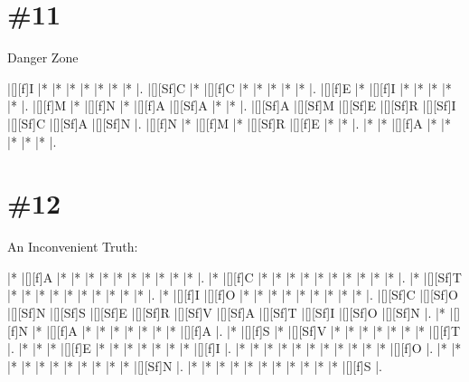 \documentclass[letterpaper]{article}
\begin{document}
\section*{\#11}
Danger Zone

\vspace*{1em}
\begin{Puzzle}{8}{7}
|[][f]I   |*        |*        |*        |*        |*        |*        |*        |. 
|[][Sf]C  |*        |[][f]C   |*        |*        |*        |*        |*        |.  
|[][f]E   |*        |[][f]I   |*        |*        |*        |*        |*        |.
|[][f]M   |*        |[][f]N   |*        |[][f]A   |[][Sf]A  |*        |*        |.  
|[][Sf]A  |[][Sf]M  |[][Sf]E  |[][Sf]R  |[][Sf]I  |[][Sf]C  |[][Sf]A  |[][Sf]N  |.
|[][f]N   |*        |[][f]M   |*        |[][Sf]R  |[][f]E   |*        |*        |. 
|*        |*        |[][f]A   |*        |*        |*        |*        |*        |.
\end{Puzzle}

\section*{\#12}

An Inconvenient Truth:
\vspace*{1em}
\begin{Puzzle}{12}{11}
|*        |[][f]A   |*        |*        |*        |*        |*        |*        |*        |*        |*        |*        |. 
|*        |[][f]C   |*        |*        |*        |*        |*        |*        |*        |*        |*        |*        |.  
|*        |[][Sf]T  |*        |*        |*        |*        |*        |*        |*        |*        |*        |*        |.
|*        |[][f]I   |[][f]O   |*        |*        |*        |*        |*        |*        |*        |*        |*        |.  
|[][Sf]C  |[][Sf]O  |[][Sf]N  |[][Sf]S  |[][Sf]E  |[][Sf]R  |[][Sf]V  |[][Sf]A  |[][Sf]T  |[][Sf]I  |[][Sf]O  |[][Sf]N  |.
|*        |[][f]N   |*        |[][f]A   |*        |*        |*        |*        |*        |*        |*        |[][f]A   |. 
|*        |[][f]S   |*        |[][Sf]V  |*        |*        |*        |*        |*        |*        |*        |[][f]T   |.
|*        |*        |*        |[][f]E   |*        |*        |*        |*        |*        |*        |*        |[][f]I   |.
|*        |*        |*        |*        |*        |*        |*        |*        |*        |*        |*        |[][f]O   |.
|*        |*        |*        |*        |*        |*        |*        |*        |*        |*        |*        |[][Sf]N  |.
|*        |*        |*        |*        |*        |*        |*        |*        |*        |*        |*        |[][f]S   |.
\end{Puzzle}
\end{document}
